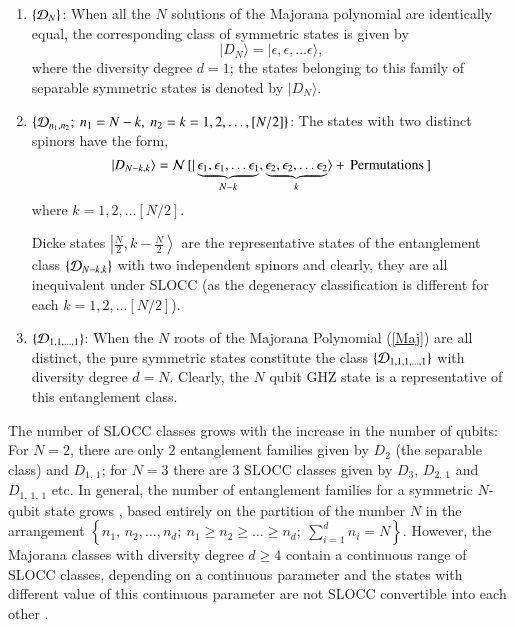 {\begin{enumerate}
\item $\{{\cal D}_N\}$: When all the $N$ solutions of the Majorana polynomial are identically equal, the corresponding class of  symmetric states is given by 
\begin{equation}
\vert D_N\rangle=\vert \epsilon,\epsilon,\ldots \epsilon\rangle,
\end{equation} 
where the diversity degree  $d=1$; the states belonging to this family of 
separable symmetric states  is denoted by $\vert D_N \rangle$.  

\item $\{{\cal D}_{n_1,n_2};\ n_1=N-k,\ n_2=k=1,2,\ldots, [N/2]\}$: The  states with two distinct spinors have the form, 
\begin{equation}
\label{n1n2}
\vert D_{N-k,k}\rangle={\cal N}\,[\vert \underbrace{\epsilon_1, \epsilon_1,\ldots 
\epsilon_1}_{N-k}, \underbrace{\epsilon_2, \epsilon_2,\ldots \epsilon_2}_{k}\rangle+{\rm \, Permutations\,}]
\end{equation} 
where $k=1,2, \ldots [N/2]$.  

Dicke states $\left\vert \frac{N}{2}, k-\frac{N}{2}\right\rangle$ are the representative states of the entanglement class 
$\{{\cal D}_{N-k,k}\}$ with two independent spinors  and clearly, they 
are all inequivalent under  SLOCC (as the degeneracy classification  is different for each $k=1,2, \ldots [N/2]$).     

\item $\{{\cal D}_{1,1,\ldots, 1}\}$:  When the $N$ roots of the Majorana Polynomial (\ref{Maj}) are all distinct,
the pure symmetric states constitute  the class $\{ {\cal D}_{1,1,1,\ldots, 1}\}$ with diversity degree  $d=N$. Clearly, the $N$ qubit GHZ state is a representative of this entanglement class. 
\end{enumerate}
\noindent The number of SLOCC classes  grows  with the increase in the number of qubits: For $N=2$, there are only $2$ entanglement families given by 
$D_{2}$ (the separable class) and $D_{1,\,1}$; for $N=3$ there are $3$ SLOCC classes given by $D_{3}$, $D_{2,\,1}$ and $D_{1,\,1,\,1} $ etc.  In general, the number of entanglement families for a symmetric $N$-qubit state grows \cite{solano}, based entirely on the partition of the number $N$ in the arrangement $\left\{n_1,\,n_2,\ldots ,n_d;\ n_1\geq n_2\geq\ldots\geq n_d;\   \sum_{i=1}^{d} 
n_i=N\right\}$. However, the Majorana classes  with diversity degree $d\geq 4$ contain a continuous range of SLOCC classes, depending on a continuous  parameter and the states with different value of this continuous  parameter  are not SLOCC convertible into each other \cite{solano}. 
   
}
